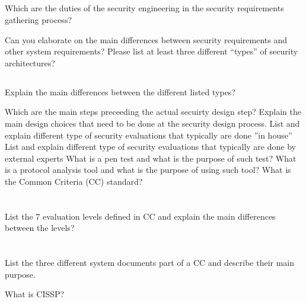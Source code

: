 \begin{questions}
\begin{parts}
  \part{} Which are the duties of the security engineering in the security requirements gathering process?
  \end{parts}

\question{} Can you elaborate on the main differences between security requirements and other system requirements?
\question{} Please list at least three different “types” of security architectures?
  \begin{parts}
  \part{} Explain the main differences between the different listed types?
  \end{parts}

\question{} Which are the main steps preceeding the actual secuirty design step?
\question{} Explain the main design choices that need to be done at the security design process.
\question{} List and explain different type of security evaluations that typically are done ”in house”
\question{} List and explain different type of security evaluations that typically are done by external experts
\question{} What is a pen test and what is the purpose of such test?
\question{} What is a protocol analysis tool and what is the purpose of using such tool?
\question{} What is the Common Criteria (CC) standard?
  \begin{parts}
  \part{} List the 7 evaluation levels defined in CC and explain the main differences between the levels?
  \part{} List the three different system documents part of a CC and describe their main purpose.
  \end{parts}

\question{} What is CISSP?\@
\end{questions}

